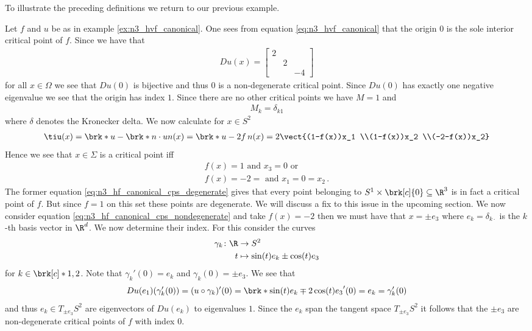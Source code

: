 To illustrate the preceding definitions we return to our previous example.
\begin{example}
  Let $f$ and $u$ be as in example \ref{ex:n3_hvf_canonical}. One sees from equation \eqref{eq:n3_hvf_canonical}
  that the origin $0$ is the sole interior critical point of $f$. Since we have that
  \begin{align*}
    Du(x) = \begin{bmatrix}
      2 & & \\
       & 2 & \\
      & & -4
    \end{bmatrix}
  \end{align*}
  for all $x\in\Omega$ we see that $Du(0)$ is bijective and thus $0$ is a non-degenerate critical point. Since $Du(0)$ has
  exactly one negative eigenvalue we see that the origin has index $1$. Since there are no other critical points we have
  $M=1$ and
  \begin{align*}
    M_k=\delta_{k1}
  \end{align*}
  where $\delta$ denotes the Kronecker delta.
  We now calculate for $x\in S^2$
  \begin{align*}
    \tiu(x) = \brk*{u-\brk*{n\cdot u}n}(x)
    = \brk*{u-2f\,n}(x)
    = 2\vect{(1-f(x))x_1 \\(1-f(x))x_2 \\(-2-f(x))x_2}
  \end{align*}
  Hence we see that $x\in\Sigma$ is a critical point iff 
  \begin{align}
    f(x)=1 \text{ and }x_3=0\text{ or } \label{eq:n3_hf_canonical_cps_degenerate} \\
    f(x)=-2 = \text{ and }x_1=0=x_2\,. \label{eq:n3_hf_canonical_cps_nondegenerate}
  \end{align}
  The former equation \eqref{eq:n3_hf_canonical_cps_degenerate} gives that every
  point belonging to $S^1\times\brk[c]{0}\subseteq\R^3$ is in fact a critical point of $f$.
  But since $f=1$ on this set these points are degenerate.
  We will discuss a fix to this issue in the upcoming section.
  We now consider equation \eqref{eq:n3_hf_canonical_cps_nondegenerate} and take 
   $f(x)=-2$ then we must have that $x=\pm e_3$ where $e_k=\delta_{k\cdot}$
  is the $k$-th basis vector in $\R^d$. We now determine their index. For this consider the curves
  \begin{align*}
    \gamma_k\colon\R&\to S^2\\
    t&\mapsto \sin(t)e_k\pm\cos(t)e_3
  \end{align*}
  for $k\in\brk[c]*{1,2}$.
  Note that $\gamma_k'(0)=e_k$ and $\gamma_k(0)=\pm e_3$.
  We see that
  \begin{align*}
    Du(e_1)(\gamma_k'(0))=(u\circ\gamma_k)'(0)
    =\brk*{\sin(t)e_k\mp2\cos(t)e_3}'(0)
    =e_k=\gamma_k'(0)
  \end{align*}
  and thus $e_k\in T_{\pm e_3}S^2$ are eigenvectors of $Du(e_k)$ to eigenvalues $1$.
  Since the $e_k$ span the tangent space $T_{\pm e_3}S^2$ it follows that
  the $\pm e_3$ are non-degenerate critical points of $f$ with index $0$.
\end{example}

